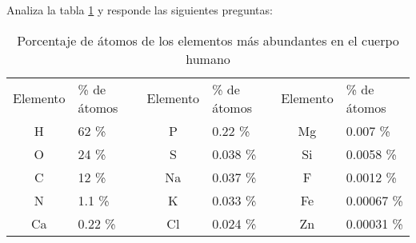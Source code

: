 Analiza la tabla \ref{tab:masa} y responde las siguientes preguntas:
\renewcommand{\arraystretch}{1.1}

\begin{table}[H]
    \centering
    \begin{tabular}{clclcl}
        {\footnotesize \cellcolor[HTML]{FFCE93}Elemento    } &
        {\footnotesize \cellcolor[HTML]{E4E4C0}\% de átomos} &
        {\footnotesize \cellcolor[HTML]{FFCE93}Elemento    } &
        {\footnotesize \cellcolor[HTML]{E4E4C0}\% de átomos} &
        {\footnotesize \cellcolor[HTML]{FFCE93}Elemento    } &
        {\footnotesize \cellcolor[HTML]{E4E4C0}\% de átomos}
        \\
        H                                                    & 62 \%   & P           &
        0.22 \%                                              & Mg      & 0.007 \%      \\
        O                                                    & 24 \%   & S           &
        0.038 \%                                             & Si      & 0.0058 \%     \\
        C                                                    & 12 \%   & Na          &
        0.037  \%                                            & F       & 0.0012   \%   \\
        N                                                    & 1.1 \%  & K           &
        0.033 \%                                             & Fe      & 0.00067 \%    \\
        Ca                                                   & 0.22 \% & Cl          &
        0.024 \%                                             & Zn      & 0.00031 \%
    \end{tabular}
    \caption{Porcentaje de átomos de los elementos más abundantes en el cuerpo
        humano}
    \label{tab:masa}
\end{table}

\begin{parts}
    
    
    
\end{parts}